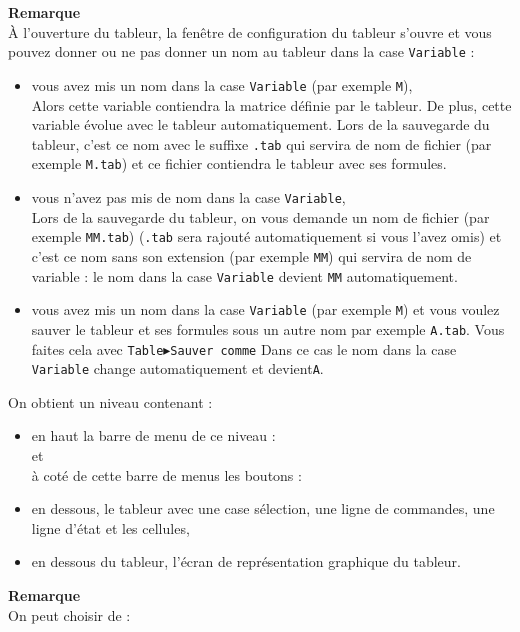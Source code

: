 \documentclass[a4paper,11pt]{article}
\begin{document}
{\bf Remarque}\\
\`A l'ouverture du tableur, la fen\^etre de configuration du tableur s'ouvre
et vous pouvez donner ou ne pas donner un nom au tableur dans la case 
{\tt Variable} :
\begin{itemize}
\item vous avez mis un nom dans la case {\tt Variable} (par exemple {\tt M}),\\
Alors cette variable contiendra la matrice d\'efinie par le tableur. De 
plus, cette variable \'evolue avec le tableur automatiquement.
Lors de la sauvegarde du tableur, c'est ce nom avec le suffixe 
{\tt .tab} qui servira de nom de fichier (par exemple {\tt M.tab}) et ce 
fichier contiendra le tableur avec ses formules.
\item vous n'avez pas mis de nom dans la case {\tt Variable},\\
Lors de la sauvegarde du tableur, on vous demande un nom de fichier (par 
exemple {\tt MM.tab}) ({\tt .tab} sera rajout\'e automatiquement si vous 
l'avez omis) et c'est ce nom sans son extension (par exemple {\tt MM}) qui 
servira de nom de variable : le nom dans la case {\tt Variable} devient
{\tt MM} automatiquement.
\item vous avez mis un nom dans la case {\tt Variable} (par exemple {\tt M}) et
vous voulez sauver le tableur et ses formules sous un autre nom par exemple 
{\tt A.tab}. Vous faites cela avec {\tt Table$\blacktriangleright$Sauver comme}
Dans ce cas le nom dans la case {\tt Variable} change automatiquement et 
devient{\tt A}.
\end{itemize}
On obtient un niveau contenant :
\begin{itemize}
\item en haut la barre de menu  de ce niveau :\\
 et\\
\`a cot\'e de cette barre de menus les boutons :\\
    
\item en dessous, le tableur avec une case s\'election, une ligne de commandes,
une  ligne d'\'etat et les cellules,
\item  en dessous du tableur, l'\'ecran de repr\'esentation graphique du tableur.
\end{itemize}
{\bf Remarque}\\
On peut choisir de :
\end{document}

